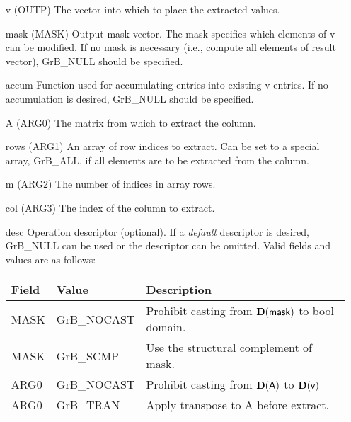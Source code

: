 \begin{itemize}[leftmargin=1in]
    \item[{\sf v}]   ({\sf OUTP}) The vector into which to place the extracted values.

    \item[{\sf mask}] ({\sf MASK}) Output mask vector. The mask
    specifies which elements of {\sf v} can be modified.
    If no mask is necessary (i.e., compute all elements of result
    vector), {\sf GrB\_NULL} should be specified.

    \item[{\sf accum}]  Function used for accumulating entries into existing {\sf v} entries. 
			If no accumulation is desired, {\sf GrB\_NULL} should be specified.

    \item[{\sf A}]   ({\sf ARG0}) The matrix from which to extract the column.

    \item[{\sf rows}]     ({\sf ARG1}) An array of row indices to extract. Can
                              be set to a special array, {\sf GrB\_ALL}, if all elements
                              are to be extracted from the column.
    \item[{\sf m}]     ({\sf ARG2}) The number of indices in array {\sf rows}.
    \item[{\sf col}]     ({\sf ARG3}) The index of the column to extract.

    \item[{\sf desc}]   Operation descriptor (optional). If a
    \emph{default} descriptor is desired, {\sf GrB\_NULL} can be
    used or the descriptor can be omitted.  Valid fields and values are as follows: \\
    \begin{tabular}{lll}
    Field  & Value & Description \\
    \hline
    {\sf MASK} & {\sf GrB\_NOCAST} & Prohibit casting from $\bold{D}({\sf mask})$ to {\sf bool} domain. \\
    {\sf MASK} & {\sf GrB\_SCMP} & Use the structural complement of {\sf mask}. \\
    {\sf ARG0} & {\sf GrB\_NOCAST} & Prohibit casting from $\bold{D}({\sf A})$ to $\bold{D}({\sf v})$ \\
    {\sf ARG0} & {\sf GrB\_TRAN} & Apply transpose to {\sf A} before extract. \\
    \end{tabular}

\end{itemize}

